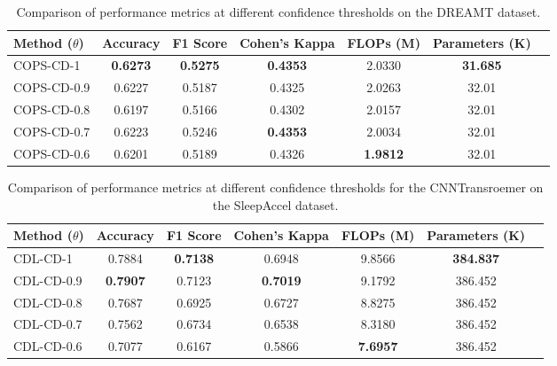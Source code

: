 \begin{table}[ht]
    \centering
    \begin{tabular}{lcccccc}
        \toprule
        Method (\(\theta\)) & Accuracy & F1 Score & Cohen's Kappa & FLOPs (M) & Parameters (K) \\
        \midrule
        COPS-CD-1 & \textbf{0.6273} & \textbf{0.5275} & \textbf{0.4353} & 2.0330 & \textbf{31.685}\\
        COPS-CD-0.9 & 0.6227 & 0.5187 & 0.4325 & 2.0263 & 32.01 \\
        COPS-CD-0.8 & 0.6197 & 0.5166 & 0.4302 & 2.0157 & 32.01 \\
        COPS-CD-0.7 & 0.6223 & 0.5246 & \textbf{0.4353} & 2.0034 & 32.01 \\
        COPS-CD-0.6 & 0.6201 & 0.5189 & 0.4326 & \textbf{1.9812} & 32.01 \\
        \bottomrule
    \end{tabular}
    \caption{Comparison of performance metrics at different confidence thresholds on the DREAMT dataset.}
    \label{tab:performance_of_different_confidence}
\end{table}

\begin{table}[ht]
    \centering
    \begin{tabular}{lcccccc}
        \toprule
        Method (\(\theta\)) & Accuracy & F1 Score & Cohen's Kappa & FLOPs (M) & Parameters (K) \\
        \midrule
        CDL-CD-1 & 0.7884 & \textbf{0.7138} & 0.6948 & 9.8566 & \textbf{384.837}\\
        CDL-CD-0.9 & \textbf{0.7907} & 0.7123 & \textbf{0.7019} & 9.1792 & 386.452 \\
        CDL-CD-0.8 & 0.7687 & 0.6925 & 0.6727 & 8.8275 & 386.452 \\
        CDL-CD-0.7 & 0.7562 & 0.6734 & 0.6538 & 8.3180 & 386.452 \\
        CDL-CD-0.6 & 0.7077 & 0.6167 & 0.5866 & \textbf{7.6957} & 386.452 \\
        \bottomrule
    \end{tabular}
    \caption{Comparison of performance metrics at different confidence thresholds for the CNNTransroemer on the SleepAccel dataset.}
    \label{tab:performance_of_different_confidence}
\end{table}

